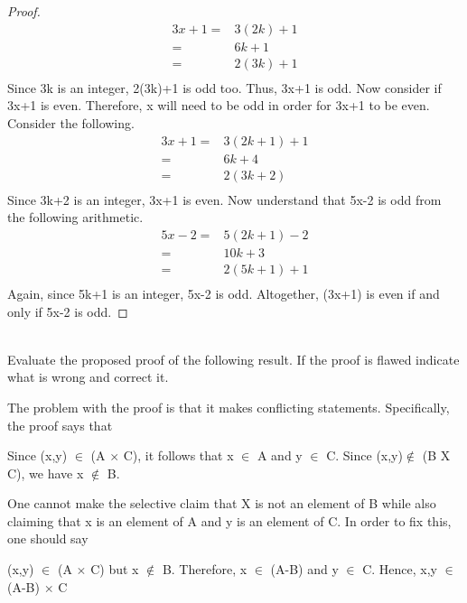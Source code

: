 \documentclass[12pt]{article}
\newenvironment{problem}[2][Problem]{\begin{trivlist}
\item[\hskip \labelsep {\bfseries #1}\hskip \labelsep {\bfseries #2.}]}{\end{trivlist}}
\begin{document}
\begin{enumerate}
\begin{proof}
\begin{align}
3x+1=&3(2k)+1\\
\nonumber
=&6k+1\\
\nonumber
=&2(3k)+1\\
\nonumber
\end{align}
Since 3k is an integer, 2(3k)+1 is odd too. Thus, 3x+1 is odd. Now consider if 3x+1 is even. Therefore, x will need to be odd in order for 3x+1 to be even. Consider the following.
\begin{align}
3x+1=&3(2k+1)+1\\
\nonumber
=&6k+4\\
\nonumber
=&2(3k+2)\\
\nonumber
\end{align}
Since 3k+2 is an integer, 3x+1 is even. Now understand that 5x-2 is odd from the following arithmetic. 
\begin{align}
5x-2=&5(2k+1)-2\\
\nonumber
=&10k+3\\
\nonumber
=&2(5k+1)+1\\
\nonumber
\end{align}
Again, since 5k+1 is an integer, 5x-2 is odd. Altogether, (3x+1) is even if and only if 5x-2 is odd. 
\end{proof}
\end{enumerate}

\begin{problem}{6}
\text{ }\\
Evaluate the proposed proof of the following result. If the proof is flawed indicate what is wrong and correct it.
\end{problem}
The problem with the proof is that it makes conflicting statements. Specifically, the proof says that\newline
\begin{center}
Since (x,y) $\in$ (A $\times$ C), it follows that x $\in$ A and y $\in$ C. Since (x,y)$\not\in$ (B X C), we have x $\not\in$ B. 
\end{center}
One cannot make the selective claim that X is not an element of B while also claiming that x is an element of A and y is an element of C. In order to fix this, one should say
\begin{center}
(x,y) $\in$ (A $\times$ C) but x $\not\in$ B. Therefore, x $\in$ (A-B) and y $\in$ C. Hence, x,y $\in$ (A-B) $\times$ C
\end{center}
\end{document}
